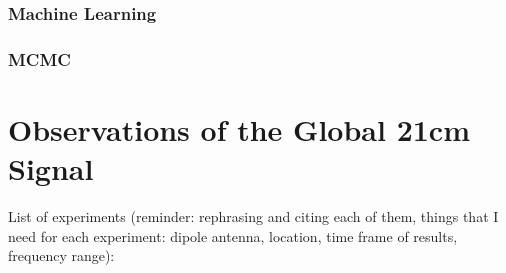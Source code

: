 \documentclass[12pt, TexShade, letterpaper]{report}
\begin{document}
\subsection{Machine Learning}
\subsection{MCMC}
\chapter{Observations of the Global 21cm Signal}
\label{chap:observations}
List of experiments (reminder: rephrasing and citing each of them,  things that I need for each experiment: dipole antenna, location, time frame of results, frequency range):\par
\end{document}
